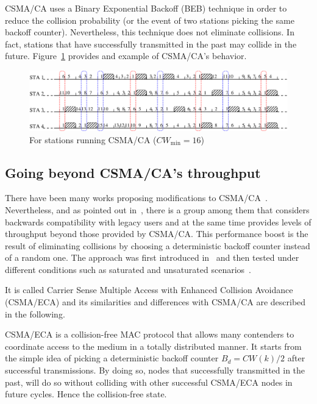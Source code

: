 CSMA/CA uses a Binary Exponential Backoff (BEB) technique in order to reduce the collision probability (or the event of two stations picking the same backoff counter). Nevertheless, this technique does not eliminate collisions. In fact, stations that have successfully transmitted in the past may collide in the future. Figure~\ref{fig:csmaCA} provides and example of CSMA/CA's behavior.

\begin{figure}[htbp]
  \centering
  \includegraphics[width=\linewidth]{csma_ca_short.eps}
  \caption{For stations running CSMA/CA ($CW_{\min}=16$)
  \label{fig:csmaCA}}
\end{figure}

\subsection{Going beyond CSMA/CA's throughput}
There have been many works proposing modifications to CSMA/CA~\cite{CSMA_ECA,bellalta2009vtc,L_MAC2,HE,bharghavan1994map,wang2004ncr,cali2000dti,lopez-toledo2006aoi,barcelo2008lba,hui2011epp,barcelo2011tcf}. Nevertheless, and as pointed out in~\cite{research2standards}, there is a group among them that considers backwards compatibility with legacy users and at the same time provides levels of throughput beyond those provided by CSMA/CA. This performance boost is the result of eliminating collisions by choosing a deterministic backoff counter instead of a random one. The approach was first introduced in~\cite{barcelo2008lba} and then tested under different conditions such as saturated and unsaturated scenarios~\cite{CSMA_ECA,bellalta2009vtc,L_MAC2,HE}. 

It is called Carrier Sense Multiple Access with Enhanced Collision Avoidance (CSMA/ECA) and its similarities and differences with CSMA/CA are described in the following.

CSMA/ECA is a collision-free MAC protocol that allows many contenders to coordinate access to the medium in a totally distributed manner. It starts from the simple idea of picking a deterministic backoff counter $B_{d}=CW(k)/2$ after successful transmissions. By doing so, nodes that successfully transmitted in the past, will do so without colliding with other successful CSMA/ECA nodes in future cycles. Hence the collision-free state.

